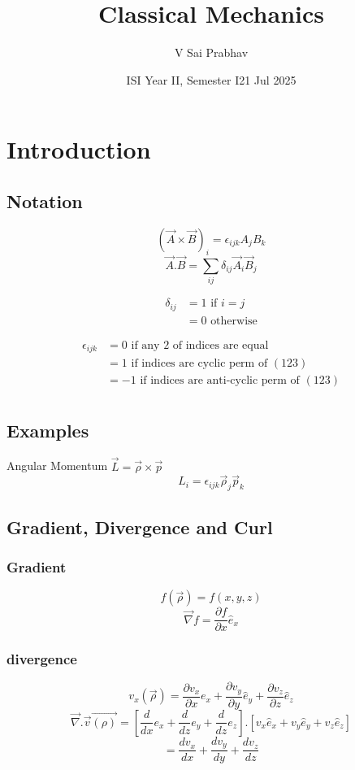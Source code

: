 \documentclass{book}
\title{Classical Mechanics}
\author{V Sai Prabhav}
\date{ISI Year II, Semester I}
\begin{document}
\maketitle

\date{21 Jul 2025}
\chapter{Introduction}
\section{Notation}

\[
  \left(\vec{A} \times  \vec{B}\right)_{i} =\epsilon_{ijk}A_jB_k
\]
\[
  \vec{A}. \vec{B}= \sum_{ij}^{} \delta_{ij} \vec{A}_{i} \vec{B}_{j}
\]

\[
  \begin{aligned}
    \delta_{ij} & = 1 \text{ if } i=j   \\
                & = 0 \text{ otherwise}
  \end{aligned}
\]


\[
  \begin{aligned}
    \epsilon_{ijk} & = 0 \text{ if any 2 of indices are equal}                 \\
                   & = 1 \text{ if indices are cyclic perm of } (1 2 3 )       \\
                   & = -1 \text{ if indices are anti-cyclic perm of } (1 2 3 ) \\
  \end{aligned}
\]


\section{Examples}
Angular Momentum \( \vec{L} = \vec{\rho} \times \vec{p}\)
\[
  L_i = \epsilon_{ijk} \vec{\rho}_{j}\vec{p}_{k}
\]

\section{Gradient, Divergence and Curl}
\subsection{Gradient}
\[
  f(\vec{\rho})= f(x,y,z)
\]
\[
  \vec{\nabla }f= \frac{\partial{f}}{\partial{x}}  \hat{e}_{x}
\]

\subsection{divergence}
$$
  v_x ( \vec{ \rho}  )=\frac{\partial{v_x}}{\partial{x}}e_x+ \frac{\partial{v_y}}{\partial{y}} \hat{e}_{y} + \frac{\partial{v_z}}{\partial{z}} \hat{e}_{z}
$$
\[
  \vec{\nabla }. \vec{v}\vec{(\rho)}= \left[ \frac{d}{dx}e_x + \frac{d}{dz}e_y + \frac{d}{dz}e_z\right] . \left[v_x \hat{e}_x+ v_y \hat{e}_{y} +v_z \hat{e} _{z} \right]
\]
\[
  = \frac{dv_x}{dx}+\frac{dv_y}{dy}+\frac{dv_z}{dz}
\]
\end{document}
